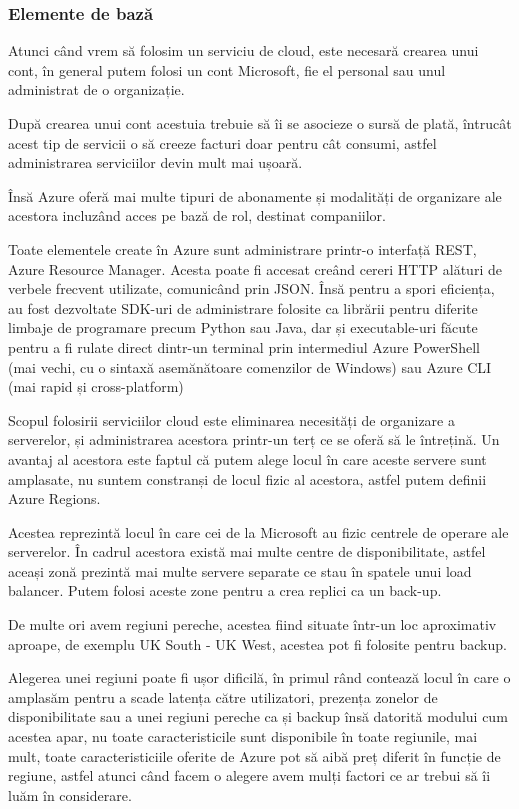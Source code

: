 \subsubsection{Elemente de bază}

Atunci când vrem să folosim un serviciu de cloud, este necesară crearea unui cont,
în general putem folosi un cont Microsoft, fie el personal sau unul administrat de o
organizație.

După crearea unui cont acestuia trebuie să îi se asocieze o sursă de plată, întrucât
acest tip de servicii o să creeze facturi doar pentru cât consumi, astfel administrarea
serviciilor devin mult mai ușoară.

Însă Azure oferă mai multe tipuri de abonamente și modalități de organizare ale acestora
incluzând acces pe bază de rol, destinat companiilor.

Toate elementele create în Azure sunt administrare printr-o interfață REST, Azure
Resource Manager. Acesta poate fi accesat creând cereri HTTP alături de verbele
frecvent utilizate, comunicând prin JSON. Însă pentru a spori eficiența, au fost dezvoltate
SDK-uri de administrare folosite ca librării pentru diferite limbaje de programare
precum Python sau Java, dar și executable-uri făcute pentru a fi rulate direct
dintr-un terminal prin intermediul Azure PowerShell (mai vechi, cu o sintaxă
asemănătoare comenzilor de Windows) sau Azure CLI (mai rapid și cross-platform)

Scopul folosirii serviciilor cloud este eliminarea necesități de organizare
a serverelor, și administrarea acestora printr-un terț ce se oferă să le întrețină.
Un avantaj al acestora este faptul că putem alege locul în care aceste servere
sunt amplasate, nu suntem constranși de locul fizic al acestora, astfel putem definii
Azure Regions.

Acestea reprezintă locul în care cei de la Microsoft au fizic centrele de operare
ale serverelor. În cadrul acestora există mai multe centre de disponibilitate, astfel
aceași zonă prezintă mai multe servere separate ce stau în spatele unui load balancer.
Putem folosi aceste zone pentru a crea replici ca un back-up.

De multe ori avem regiuni pereche, acestea fiind situate într-un loc aproximativ
aproape, de exemplu UK South - UK West, acestea pot fi folosite pentru backup.

Alegerea unei regiuni poate fi ușor dificilă, în primul rând contează locul în
care o amplasăm pentru a scade latența către utilizatori, prezența zonelor de
disponibilitate sau a unei regiuni pereche ca și backup însă datorită modului
cum acestea apar, nu toate caracteristicile sunt disponibile în toate regiunile,
mai mult, toate caracteristiciile oferite de Azure pot să aibă preț diferit
în funcție de regiune, astfel atunci când facem o alegere avem mulți factori
ce ar trebui să îi luăm în considerare.

